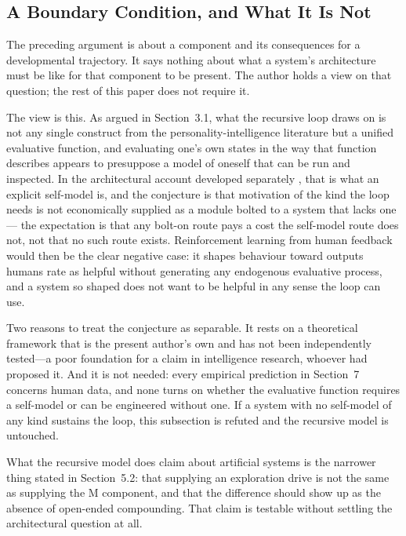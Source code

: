 \documentclass[12pt,a4paper]{article}
\begin{document}
\subsection{A Boundary Condition, and What It Is Not}

The preceding argument is about a component and its consequences for a developmental trajectory. It says nothing about what a system's architecture must be like for that component to be present. The author holds a view on that question; the rest of this paper does not require it.

The view is this. As argued in Section~3.1, what the recursive loop draws on is not any single construct from the personality-intelligence literature but a unified evaluative function, and evaluating one's own states in the way that function describes appears to presuppose a model of oneself that can be run and inspected. In the architectural account developed separately \citep{Gruber2026}, that is what an explicit self-model is, and the conjecture is that motivation of the kind the loop needs is not economically supplied as a module bolted to a system that lacks one ---\hspace{0pt} the expectation is that any bolt-on route pays a cost the self-model route does not, not that no such route exists. Reinforcement learning from human feedback would then be the clear negative case: it shapes behaviour toward outputs humans rate as helpful without generating any endogenous evaluative process, and a system so shaped does not want to be helpful in any sense the loop can use.

Two reasons to treat the conjecture as separable. It rests on a theoretical framework that is the present author's own and has not been independently tested---\hspace{0pt}a poor foundation for a claim in intelligence research, whoever had proposed it. And it is not needed: every empirical prediction in Section~7 concerns human data, and none turns on whether the evaluative function requires a self-model or can be engineered without one. If a system with no self-model of any kind sustains the loop, this subsection is refuted and the recursive model is untouched.

What the recursive model does claim about artificial systems is the narrower thing stated in Section~5.2: that supplying an exploration drive is not the same as supplying the M component, and that the difference should show up as the absence of open-ended compounding. That claim is testable without settling the architectural question at all.
\end{document}

